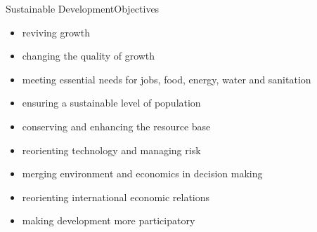 \begin{frame}{Sustainable Development}{Objectives}
\begin{itemize}
 \item reviving growth
 \item changing the quality of growth
 \item meeting essential needs for jobs, food, energy, water and sanitation
 \item ensuring a sustainable level of population
 \item conserving and enhancing the resource base
 \item reorienting technology and managing risk
 \item merging environment and economics in decision making
 \item reorienting international economic relations
 \item making development more participatory
\end{itemize}

\end{frame}

